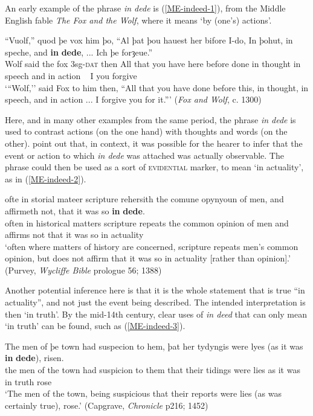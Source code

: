An early example of the phrase \emph{in dede} is (\ref{ME-indeed-1}), from the Middle English fable \emph{The Fox and the Wolf}, where it means `by (one's) actions'.

\begin{exe}
\ex
\gll ``Vuolf,'' quod þe vox him þo, ``Al þat þou hauest her bifore I-do, In þohut, in speche, and \textbf{in} \textbf{dede}, ... Ich þe forȝeue.''\\
Wolf said the fox 3sg-\textsc{dat} then All that you have here before done in thought in speech and in action ~ I you forgive\\
\trans `{``}Wolf,'' said Fox to him then, ``All that you have done before this, in thought, in speech, and in action ... I forgive you for it.{''}' \hfill (\emph{Fox and Wolf}, c. 1300)
\label{ME-indeed-1}
\end{exe}

\noindent Here, and in many other examples from the same period, the phrase \emph{in dede} is used to contrast actions (on the one hand) with thoughts and words (on the other). \citet{TraugottDasher2002} point out that, in context, it was possible for the hearer to infer that the event or action to which \emph{in dede} was attached was actually observable. The phrase could then be used as a sort of \textsc{evidential} marker, to mean `in actuality', as in (\ref{ME-indeed-2}).

\begin{exe}
\ex
\gll ofte in storial mateer scripture rehersith the comune opynyoun of men, and affirmeth not, that it was so \textbf{in} \textbf{dede}.\\
often in historical matters scripture repeats the common opinion of men and affirms not that it was so in actuality\\
\trans `often where matters of history are concerned, scripture repeats men's common opinion, but does not affirm that it was so in actuality [rather than opinion].' \hfill (Purvey, \emph{Wycliffe Bible} prologue 56; 1388)
\label{ME-indeed-2}
\end{exe}

\noindent Another potential inference here is that it is the whole statement that is true ``in actuality'', and not just the event being described. The intended interpretation is then `in truth'. By the mid-14th century, clear uses of \emph{in deed} that can only mean `in truth' can be found, such as (\ref{ME-indeed-3}).

\begin{exe}
\ex
\gll The men of þe town had suspecion to hem, þat her tydyngis were lyes (as it was \textbf{in} \textbf{dede}), risen.\\
the men of the town had suspicion to them that their tidings were lies as it was in truth rose\\
\trans `The men of the town, being suspicious that their reports were lies (as was certainly true), rose.' \hfill (Capgrave, \emph{Chronicle} p216; 1452)
\label{ME-indeed-3}
\end{exe}

